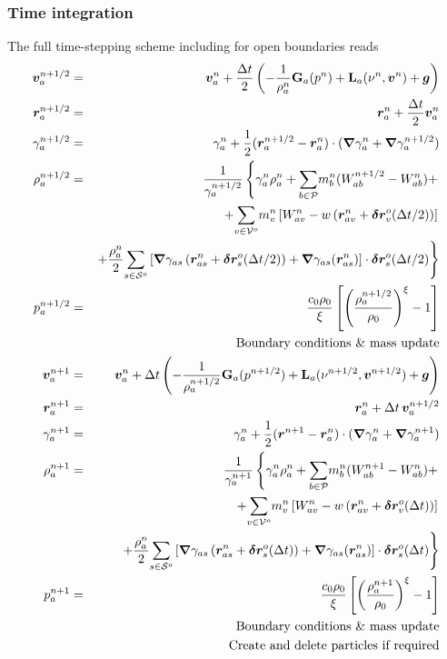 \documentclass{../GPUSPHtemplate}
\begin{document}
\subsubsection{Time integration}
The full time-stepping scheme including for open boundaries reads
\begin{eqnarray}
\bm{v}_a^{n+1/2} &=& \bm{v}_a^n + \frac{\Delta t}{2} \left(
-\frac{1}{\rho^n_a}\textbf{G}_a(p^n) + \textbf{L}_a(\nu^n,\bm{v}^n) + \bm{g}
\right)
\label{e:open:pred-corr-ns}
\\
\bm{r}_a^{n+1/2} &=& \bm{r}_a^{n} + \frac{\Delta t}{2}
\bm{v}_a^{n}
\nonumber
\\
\gamma_a^{n+1/2} &=& \gamma_a^{n} + \frac{1}{2}
(\bm{r}_a^{n+1/2} - \bm{r}_a^{n}) \cdot (\bm{\nabla} \gamma_a^n + \bm{\nabla} \gamma_a^{n+1/2})
\nonumber
\\
\rho_a^{n+1/2} &=& \frac{1}{\gamma_a^{n+1/2}}\left\{ \gamma_a^n \rho_a^n +
\underset{b \in \mathcal{P}}{\sum} m_b^n (W_{ab}^{n+1/2} - W_{ab}^n) + \right.
\nonumber
\\
&&\left. + \underset{v\in\mathcal{V}^o}{\sum}m_v^n\left[ W_{av}^n -
w\left( \bm{r}_{av}^n + \bm{\delta r}_v^o(\Delta t/2) \right) \right]\right.
\nonumber
\\
&&\left. + \frac{\rho_a^n}{2}\underset{s\in\mathcal{S}^o}{\sum}\left[
\bm{\nabla}\gamma_{as}\left(\bm{r}_{as}^n + \bm{\delta r}_s^o(\Delta t/2)\right) +
\bm{\nabla}\gamma_{as}(\bm{r}_{as}^n)
\right]\cdot\bm{\delta r}_s^o(\Delta t/2)\right\}
\nonumber
\\
p_a^{n+1/2} &=& \frac{c_0 \rho_0}{\xi}\left[ \left( \frac{\rho_a^{n+1/2}}{\rho_0}\right)^\xi
-1 \right]
\nonumber
\\
&&\mbox{Boundary conditions \& mass update}
\nonumber
\\
\bm{v}_a^{n+1} &=& \bm{v}_a^n + \Delta t \left(
-\frac{1}{\rho^{n+1/2}_a}\textbf{G}_a(p^{n+1/2}) +
\textbf{L}_a(\nu^{n+1/2},\bm{v}^{n+1/2}) + \bm{g}
\right)
\nonumber
\\
\bm{r}_a^{n+1} &=& \bm{r}_a^{n} + \Delta t\,
\bm{v}_a^{n+1/2}
\nonumber
\\
\gamma_a^{n+1} &=& \gamma_a^{n} +\frac{1}{2}
(\bm{r}^{n+1} - \bm{r}_a^{n}) \cdot (\bm{\nabla} \gamma_a^n + \bm{\nabla} \gamma_a^{n+1})
\nonumber
\\
\rho_a^{n+1} &=& \frac{1}{\gamma_a^{n+1}}\left\{ \gamma_a^n \rho_a^n +
\underset{b \in \mathcal{P}}{\sum} m_b^n (W_{ab}^{n+1} - W_{ab}^n) + \right.
\nonumber
\\
&&\left. + \underset{v\in\mathcal{V}^o}{\sum}m_v^n\left[ W_{av}^n -
w\left( \bm{r}_{av}^n + \bm{\delta r}_v^o(\Delta t) \right) \right]\right.
\nonumber
\\
&&\left. + \frac{\rho_a^n}{2}\underset{s\in\mathcal{S}^o}{\sum}\left[
\bm{\nabla}\gamma_{as}\left(\bm{r}_{as}^n + \bm{\delta r}_s^o(\Delta t)\right) +
\bm{\nabla}\gamma_{as}(\bm{r}_{as}^n)
\right]\cdot\bm{\delta r}_s^o(\Delta t)\right\}
\nonumber
\\
p_a^{n+1} &=& \frac{c_0 \rho_0}{\xi}\left[ \left( \frac{\rho_a^{n+1}}{\rho_0}\right)^\xi
-1 \right]
\nonumber
\\
&&\mbox{Boundary conditions \& mass update}
\nonumber
\\
&&\mbox{Create and delete particles if required}
\nonumber
\end{eqnarray}
\end{document}

